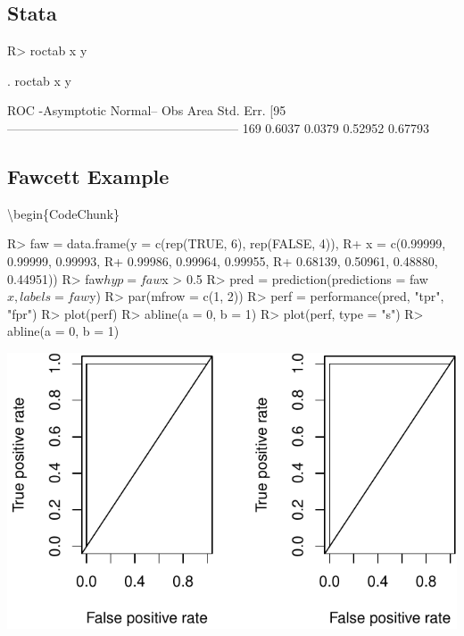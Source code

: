 \documentclass[article]{jss}
\begin{document}
\hypertarget{stata}{%
\subsection{Stata}\label{stata}}

\begin{CodeChunk}

\begin{CodeInput}
R> roctab x y
\end{CodeInput}


\begin{CodeOutput}
 . roctab x y

                      ROC                    -Asymptotic Normal--
           Obs       Area     Std. Err.      [95%
         --------------------------------------------------------
           169     0.6037       0.0379        0.52952     0.67793
\end{CodeOutput}
\end{CodeChunk}

\hypertarget{fawcett-example}{%
\subsection{Fawcett Example}\label{fawcett-example}}

\textbackslash{}begin\{CodeChunk\}

\begin{CodeInput}
R> faw = data.frame(y = c(rep(TRUE, 6), rep(FALSE, 4)),
R+                  x = c(0.99999, 0.99999, 0.99993, 
R+                        0.99986, 0.99964, 0.99955, 
R+                        0.68139, 0.50961, 0.48880, 0.44951))
R> faw$hyp = faw$x > 0.5
R> pred = prediction(predictions = faw$x, labels = faw$y)
R> par(mfrow = c(1, 2))
R> perf = performance(pred, "tpr", "fpr")
R> plot(perf)
R> abline(a = 0, b = 1)
R> plot(perf, type = "s")
R> abline(a = 0, b = 1)
\end{CodeInput}


\begin{center}\includegraphics{index_files/figure-latex/fawcett-1} \end{center}
\end{document}
